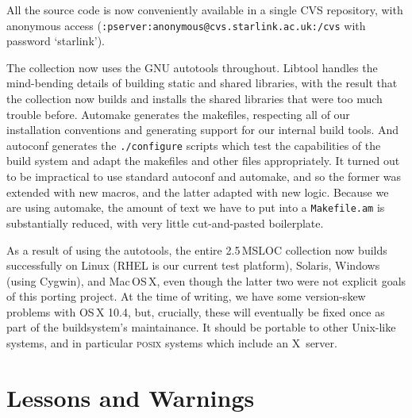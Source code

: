 \documentclass{speauth}
\begin{document}
All the source code is now conveniently available in a single CVS
repository, with anonymous access
(\texttt{:pserver:anonymous@cvs.starlink.ac.uk:/cvs} with password `starlink').

The collection now uses the GNU autotools throughout.  Libtool handles the
mind-bending details of building static and shared libraries, with the
result that the collection now builds and installs the shared
libraries that were too much trouble before.  Automake generates the
makefiles, respecting all of our installation conventions and
generating support for our internal build tools.  And autoconf
generates the \texttt{./configure} scripts which test the capabilities
of the build system and adapt the makefiles and other files
appropriately.  It turned out to be impractical to use standard
autoconf and automake, and so the former was extended with new macros,
and the latter adapted with new logic.  Because we are using automake,
the amount of text we have to put into a \texttt{Makefile.am} is
substantially reduced, with very little cut-and-pasted boilerplate.

As a result of using the autotools, the entire 2.5\,MSLOC collection
now builds successfully on Linux (RHEL is our current test platform),
Solaris, Windows (using Cygwin), and Mac\,OS\,X, even though the
latter two were not explicit goals of this porting project.  At the
time of writing, we have some version-skew problems with OS\,X 10.4,
but, crucially, these will eventually be fixed once as part of the
buildsystem's maintainance.  It should
be portable to other Unix-like systems, and in particular
\textsc{posix} systems which include an X~server.



\section{Lessons and Warnings}
\label{s:lessons}
\end{document}
